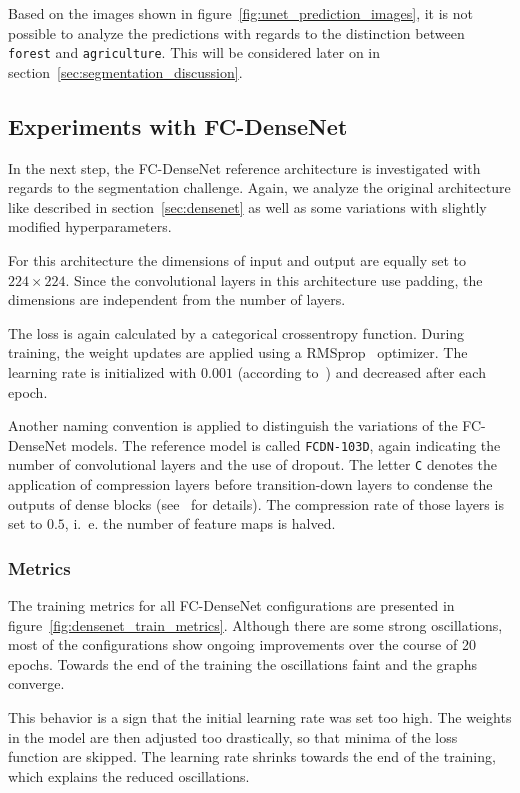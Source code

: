Based on the images shown in figure~\ref{fig:unet_prediction_images}, it is not possible to analyze the predictions with regards to the distinction between \texttt{forest} and \texttt{agriculture}. This will be considered later on in section~\ref{sec:segmentation_discussion}.

\subsection{Experiments with FC-DenseNet}
In the next step, the FC-DenseNet reference architecture is investigated with regards to the segmentation challenge. Again, we analyze the original architecture like described in section~\ref{sec:densenet} as well as some variations with slightly modified hyperparameters.

For this architecture the dimensions of input and output are equally set to $224\times 224$. Since the convolutional layers in this architecture use padding, the dimensions are independent from the number of layers.

The loss is again calculated by a categorical crossentropy function. During training, the weight updates are applied using a RMSprop~\cite{rmsprop14} optimizer. The learning rate is initialized with $0.001$ (according to~\cite{denseseg17}) and decreased after each epoch.

Another naming convention is applied to distinguish the variations of the FC-DenseNet models. The reference model is called \texttt{FCDN-103D}, again indicating the number of convolutional layers and the use of dropout. The letter \texttt{C} denotes the application of compression layers before transition-down layers to condense the outputs of dense blocks (see~\cite{denseseg17} for details). The compression rate of those layers is set to $0.5$, i.~e. the number of feature maps is halved.

\subsubsection{Metrics}
The training metrics for all FC-DenseNet configurations are presented in figure~\ref{fig:densenet_train_metrics}. Although there are some strong oscillations, most of the configurations show ongoing improvements over the course of 20 epochs. Towards the end of the training the oscillations faint and the graphs converge.

This behavior is a sign that the initial learning rate was set too high. The weights in the model are then adjusted too drastically, so that minima of the loss function are skipped. The learning rate shrinks towards the end of the training, which explains the reduced oscillations.

